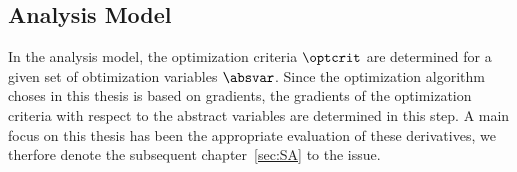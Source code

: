 \documentclass[../main.tex]{subfiles}
\begin{document}
\subsection{Analysis Model}\label{sec:analysis_model}
In the analysis model, the optimization criteria $\optcrit$ are determined for a given set of obtimization variables $\absvar$. Since the optimization algorithm choses in this thesis is based on gradients, the gradients of the optimization criteria with respect to the abstract variables are determined in this step. A main focus on this thesis has been the appropriate evaluation of these derivatives, we therfore denote the subsequent chapter~\ref{sec:SA} to the issue.
\end{document}
